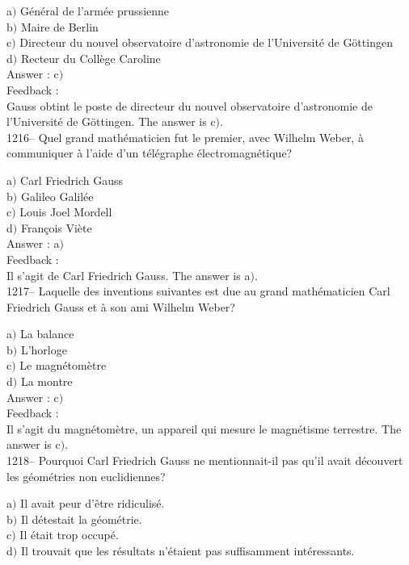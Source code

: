 ﻿\documentclass[letterpaper, 12pt]{article}
\begin{document}
a$)$ G\'en\'eral de l'arm\'ee prussienne \\
b$)$ Maire de Berlin \\
c$)$ Directeur du nouvel observatoire d'astronomie de l'Universit\'e de
G\"ottingen \\
d$)$ Recteur du Coll\`ege Caroline\\

Answer : c$)$\\

Feedback : \\
Gauss obtint le poste de directeur du nouvel observatoire
d'astronomie de l'Universit\'e de G\"ottingen.
The answer is c$)$.\\

1216-- Quel grand math\'ematicien fut le premier, avec Wilhelm
Weber, \`a communiquer \`a l'aide d'un t\'el\'egraphe
\'electromagn\'etique?

a$)$ Carl Friedrich Gauss \\
b$)$ Galileo Galil\'ee \\
c$)$ Louis Joel Mordell \\
d$)$ Fran\c cois Vi\`ete\\

Answer : a$)$\\

Feedback : \\
Il s'agit de Carl Friedrich Gauss.
The answer is a$)$.\\

1217-- Laquelle des inventions suivantes est due au grand
math\'ematicien Carl Friedrich Gauss et \`a son ami Wilhelm Weber?

a$)$ La balance \\
b$)$ L'horloge \\
c$)$ Le magn\'etom\`etre \\
d$)$ La montre\\

Answer : c$)$\\

Feedback : \\
Il s'agit du magn\'etom\`etre, un appareil qui mesure le
magn\'etisme terrestre.
The answer is c$)$.\\

1218-- Pourquoi Carl Friedrich Gauss ne mentionnait-il pas qu'il
avait d\'ecouvert les g\'eom\'etries non euclidiennes?

a$)$ Il avait peur d'\^etre ridiculis\'e. \\
b$)$ Il d\'etestait la g\'eom\'etrie. \\
c$)$ Il \'etait trop occup\'e. \\
d$)$ Il trouvait que les r\'esultats n'\'etaient pas suffisamment
int\'eressants.\\
\end{document}
